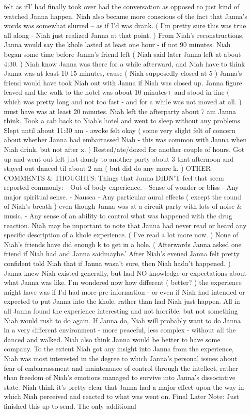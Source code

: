 \documentclass[12pt]{book}
\begin{document}
felt as ifI' had finally took over had the conversation as opposed to just kind of watched Janna happen. Niah also became more conscious of the fact that Janna's words was somewhat slurred -- as if I'd was drank. ( I'm pretty sure this was true all along - Niah just realized Janna at that point. ) From Niah's reconstructions, Janna would say the khole lasted at least one hour - if not 90 minutes. Niah began some time before Janna's friend left ( Niah said later Janna left at about 4:30. ) Niah know Janna was there for a while afterward, and Niah have to think Janna was at least 10-15 minutes, cause ( Niah supposedly closed at 5 ) Janna's friend would have took Niah out with Janna if Niah was closed up. Janna figure leaved and the walk to the hotel was about 10 minutes+ and stood in line ( which was pretty long and not too fast - and for a while was not moved at all. ) must have was at least 20 minutes. Niah left the afterparty about 7 am Janna think. Took a cab back to Niah's hotel and went to sleep without any problems. Slept until about 11:30 am - awoke felt okay ( some very slight felt of concern about whether Janna had embarrassed Niah - this was common with Janna when Niah drink, but not after x. ) Rested/ate/dozed for another couple of hours. Got up and went out felt just dandy to another party about 3 that afternoon and stayed out danced til about 2 am ( but did do any more k. ) OTHER COMMENTS \& THOUGHTS: Things that Janna DIDN'T feel that seem reported commonly: - Out of body experience. - Sense of wonder or bliss - Any major spiritual sense. - Nausea - Any particular aural effects ( except the sound of Niah's breath ) even though Janna was at a circuit party with lots of noise \& music. - Any sense of an ability to control what was happened with the drug reaction. Niah may be important to note that Janna had never read or heard any specific description of a khole experience. ( I've read a lot more now. ) None of Niah's friends have did enough k to get in a hole. ( Afterwards Janna asked one friend if Niah had and Janna saidmaybe.' After Niah's evened Janna felt pretty confident told Niah that if Janna wasn't sure, then Niah hadn't happened. ) Janna knew Niah existed generally, but had NO knowledge or expectations about what Janna was like. I'm wondered now how different ( better? ) the experience might have was if I'd had more pre-information - or even if Niah had intended or expected to put Janna into the khole, rather than had Niah just happen. All in all Janna found the experience interesting and not horrible, but not something Niah would rush to do again. If Janna do, Niah will probably want to do Janna in a very different environment - more peaceful, less complex - without all the danced and walked. Niah also think Janna would be better to have some company. To the extent Niah got any insight into Janna from the experience, Niah was most interested in the degree to which Janna's personal issues about fear of embarrassment and maintenance of control through the intellect, rather than freedom of Niah's emotions managed to survive into Janna's dissociative state. Niah think it's pretty clear that Janna had a major effect upon the way in which Niah perceived and reacted to what was went on. Final Later Note: Just finished this up to send. The only additional 
\end{document}
